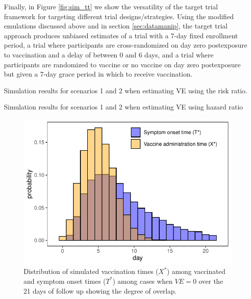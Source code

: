 \begin{appendices}
\begin{refsection}
    Finally, in Figure \ref{fig:sim_tt} we show the versatility of the target trial framework for targeting different trial designs/strategies. Using the modified emulations discussed above and in section \ref{sec:datamanip}, the target trial approach produces unbiased estimates of a trial with a 7-day fixed enrollment period, a trial where participants are cross-randomized on day zero postexposure to vaccination and a delay of between 0 and 6 days, and a trial where participants are randomized to vaccine or no vaccine on day zero postexposure but given a 7-day grace period in which to receive vaccination.

    \begin{table}[p]
        \centering
        \caption{Simulation results for scenarios 1 and 2 when estimating VE using the risk ratio.}\label{tab:sim_results_rr}
        
    \end{table}

    \begin{table}[p]
        \centering
        \caption{Simulation results for scenarios 1 and 2 when estimating VE using hazard ratio}\label{tab:sim_results_hr}
        
    \end{table}

    \clearpage

    \begin{figure}[p]
        \centering
        \includegraphics{../../../../3_figures/dist.pdf}
        \caption{Distribution of simulated vaccination times ($X^*$) among vaccinated and symptom onset times ($T^*$) among cases when $VE = 0$ over the 21 days of follow up showing the degree of overlap.}
        \label{fig:example_overlap_appendix}
    \end{figure}


\end{refsection}
\end{appendices}
